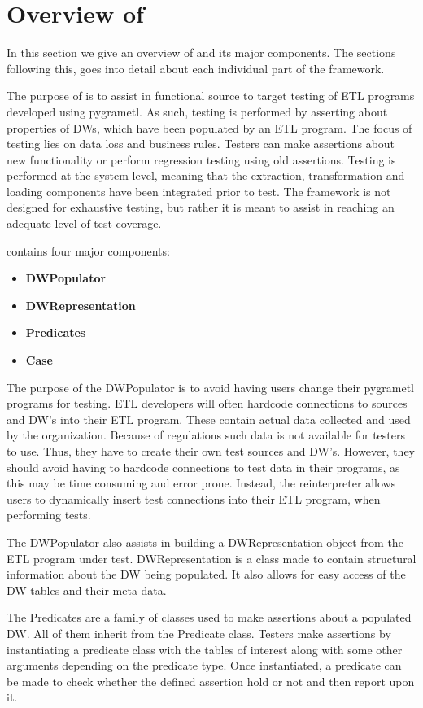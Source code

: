 \section{Overview of \FW{}}\label{sect:Overview}
In this section we give an overview of \FW{} and its major components. The sections following this,  goes into detail about each individual part of the framework.

The purpose of \FW{} is to assist in functional source to target testing of ETL programs developed using pygrametl. As such, testing is performed by asserting about properties of DWs, which have been populated by an ETL program. The focus of testing lies on data loss and business rules. Testers can make assertions about new functionality or perform regression testing using old assertions. Testing is performed at the system level, meaning that the extraction, transformation and loading components have been integrated prior to test. The framework is not designed for exhaustive testing, but rather it is meant to assist in reaching an adequate level of test coverage.

\FW{} contains four major components:
\begin{itemize}
\item\textbf{DWPopulator}
\item\textbf{DWRepresentation}
\item\textbf{Predicates}
\item\textbf{Case}
\end{itemize}

The purpose of the DWPopulator is to avoid having users change their pygrametl programs for testing. ETL developers will often hardcode connections to sources and DW's into their ETL program. These contain actual data collected and used by the organization. Because of regulations such data is not available for testers to use. Thus, they have to create their own test sources and DW's. However, they should avoid having to hardcode connections to test data in their programs, as this may be time consuming and error prone. Instead, the reinterpreter allows users to dynamically insert test connections into their ETL program, when performing tests.

The DWPopulator also assists in building a DWRepresentation object from the ETL program under test. DWRepresentation is a class made to contain structural information about the DW being populated. It also allows for easy access of the DW tables and their meta data.

The Predicates are a family of classes used to make assertions about a populated DW. All of them inherit from the Predicate class. Testers make assertions by instantiating a predicate class with the tables of interest along with some other arguments depending on the predicate type. Once instantiated, a predicate can be made to check whether the defined assertion hold or not and then report upon it.

